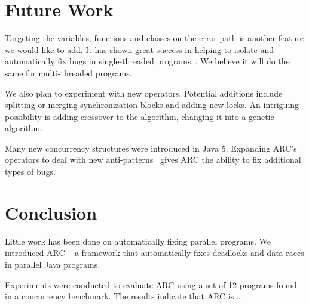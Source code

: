 \documentclass{llncs}
\begin{document}

\section{Future Work}
\label{sec:future_work}

Targeting the variables, functions and classes on the error path is another
feature we would like to add. It has shown great success in helping to isolate
and automatically fix bugs in single-threaded programs~\cite{FNWG09, NWLF09,
WFGN10, GNFW11}. We believe it will do the same for multi-threaded programs.

We also plan to experiment with new operators. Potential additions include
splitting or merging synchronization blocks and adding new locks.  An intriguing
possibility is adding crossover to the algorithm, changing it into a genetic
algorithm.

Many new concurrency structures were introduced in Java 5. Expanding ARC's
operators to deal with new anti-patterns~\cite{BJ09, BCD06} gives ARC the
ability to fix additional types of bugs.

\section{Conclusion}
\label{sec:conclusion}

Little work has been done on automatically fixing parallel programs. We
introduced ARC -- a framework that automatically fixes deadlocks and data races
in parallel Java programs.

Experiments were conducted to evaluate ARC using a set of 12 programs found in
a concurrency benchmark. The results indicate that ARC is \ldots %



\end{document}
